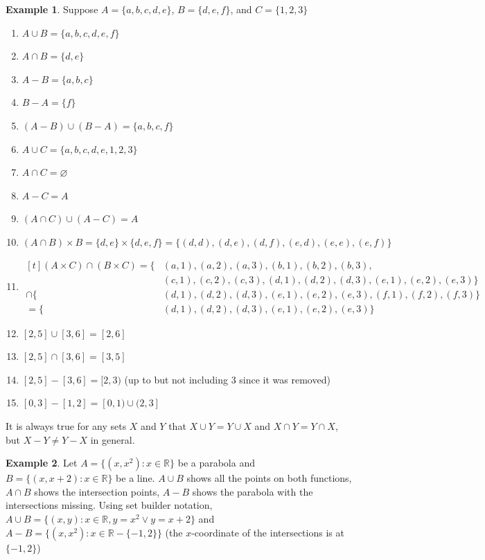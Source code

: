 \documentclass[10pt]{article}
\newcommand{\R}{\mathbb{R}}
\theoremstyle{definition}
\newtheorem{example}{Example}
\begin{document}
    \begin{example} Suppose $A = \{a,b,c,d,e\}$, $B = \{d,e,f\}$, and $C = \{1,2,3\}$
        \begin{enumerate}
            \item $A\cup B = \{a,b,c,d,e,f\}$
            \item $A\cap B = \{d,e\}$
            \item $A-B = \{a,b,c\}$
            \item $B-A = \{f\}$
            \item $(A-B)\cup(B-A)=\{a,b,c,f\}$
            \item $A\cup C = \{a,b,c,d,e,1,2,3\}$
            \item $A\cap C = \varnothing$
            \item $A-C = A$
            \item $(A\cap C)\cup (A-C) = A$
            \item $(A\cap B)\times B = \{d,e\}\times\{d,e,f\} = \{(d,d),(d,e),(d,f),(e,d),(e,e),(e,f)\}$
            \item $
                \begin{aligned}[t]
                    (A\times C)\cap(B\times C) = \{
                        &(a,1),(a,2),(a,3),(b,1),(b,2),(b,3),\\
                        &(c,1),(c,2),(c,3),(d,1),(d,2),(d,3),(e,1),(e,2),(e,3)
                    \}\\
                    \cap\{&(d,1),(d,2),(d,3),(e,1),(e,2),(e,3),(f,1),(f,2),(f,3)\}\\
                    = \{&(d,1),(d,2),(d,3),(e,1),(e,2),(e,3)\}
                \end{aligned}
                $
            \item $[2,5]\cup[3,6]=[2,6]$
            \item $[2,5]\cap[3,6]=[3,5]$
            \item $[2,5]-[3,6]=[2,3)$ (up to but not including 3 since it was removed)
            \item $[0,3]-[1,2]=[0,1)\cup(2,3]$
        \end{enumerate}
    \end{example}

    It is always true for any sets $X$ and $Y$ that $X \cup Y = Y \cup X$ and $X \cap Y = Y \cap X$, but $X - Y \neq Y - X$ in general.

    \begin{example}
        Let $A = \{(x,x^2):x\in\R\}$ be a parabola and $B =\{(x,x+2):x\in\R\}$ be a line. $A\cup B$ shows all the points on both functions, $A\cap B$ shows the intersection points, $A-B$ shows the parabola with the intersections missing. Using set builder notation, $A\cup B =\{(x,y):x\in\R, y = x^2 \lor y=x+2\}$ and $A-B = \{(x,x^2): x\in\R-\{-1,2\}\}$ (the $x$-coordinate of the intersections is at $\{-1,2\}$)
    \end{example}
\end{document}
